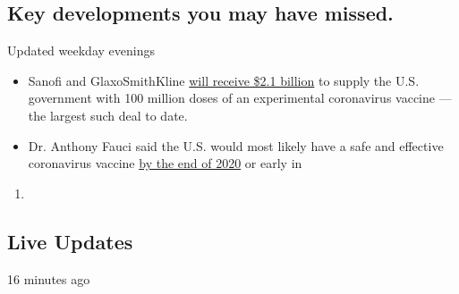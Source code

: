 \hypertarget{key-developments-you-may-have-missed}{%
\subsection{Key developments you may have
missed.}\label{key-developments-you-may-have-missed}}

Updated weekday evenings

\begin{itemize}
\tightlist
\item
  Sanofi and GlaxoSmithKline
  \href{https://www.nytimes3xbfgragh.onion/2020/07/31/health/covid-19-vaccine-sanofi-gsk.html}{will
  receive \$2.1 billion} to supply the U.S. government with 100 million
  doses of an experimental coronavirus vaccine --- the largest such deal
  to date.
\item
  Dr. Anthony Fauci said the U.S. would most likely have a safe and
  effective coronavirus vaccine
  \href{https://www.nytimes3xbfgragh.onion/aponline/2020/07/31/us/politics/ap-us-virus-outbreak-fauci.html}{by
  the end of 2020} or early in
\end{itemize}

\begin{enumerate}
\def\labelenumi{\arabic{enumi}.}
\setcounter{enumi}{2020}
\item
\end{enumerate}

\hypertarget{live-updates}{%
\subsection{Live Updates}\label{live-updates}}

16 minutes ago

